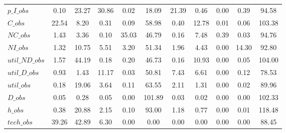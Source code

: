 \begin{center}
\begin{longtable}{lcccccccccc}
$p\_I\_obs      $	 & 	                0.10	 & 	               23.27	 & 	               30.86	 & 	                0.02	 & 	               18.09	 & 	               21.39	 & 	                0.46	 & 	                0.00	 & 	                0.39	 & 	               94.58 \\ 
$C\_obs         $	 & 	               22.54	 & 	                8.20	 & 	                0.31	 & 	                0.09	 & 	               58.98	 & 	                0.40	 & 	               12.78	 & 	                0.01	 & 	                0.06	 & 	              103.38 \\ 
$NC\_obs        $	 & 	                1.43	 & 	                3.36	 & 	                0.10	 & 	               35.03	 & 	               46.79	 & 	                0.16	 & 	                7.48	 & 	                0.39	 & 	                0.03	 & 	               94.76 \\ 
$NI\_obs        $	 & 	                1.32	 & 	               10.75	 & 	                5.51	 & 	                3.20	 & 	               51.34	 & 	                1.96	 & 	                4.43	 & 	                0.00	 & 	               14.30	 & 	               92.80 \\ 
$util\_ND\_obs  $	 & 	                1.57	 & 	               44.19	 & 	                0.18	 & 	                0.20	 & 	               46.73	 & 	                0.16	 & 	               10.93	 & 	                0.00	 & 	                0.05	 & 	              104.00 \\ 
$util\_D\_obs   $	 & 	                0.93	 & 	                1.43	 & 	               11.17	 & 	                0.03	 & 	               50.81	 & 	                7.43	 & 	                6.61	 & 	                0.00	 & 	                0.12	 & 	               78.53 \\ 
$util\_obs      $	 & 	                0.18	 & 	               19.06	 & 	                3.64	 & 	                0.11	 & 	               63.55	 & 	                2.11	 & 	                1.31	 & 	                0.00	 & 	                0.02	 & 	               89.96 \\ 
$D\_obs         $	 & 	                0.05	 & 	                0.28	 & 	                0.05	 & 	                0.00	 & 	              101.89	 & 	                0.03	 & 	                0.02	 & 	                0.00	 & 	                0.00	 & 	              102.33 \\ 
$h\_obs         $	 & 	                0.38	 & 	               20.88	 & 	                2.15	 & 	                0.10	 & 	               93.00	 & 	                1.18	 & 	                0.77	 & 	                0.00	 & 	                0.01	 & 	              118.48 \\ 
$tech\_obs      $	 & 	               39.26	 & 	               42.89	 & 	                6.30	 & 	                0.00	 & 	                0.00	 & 	                0.00	 & 	                0.00	 & 	                0.00	 & 	                0.00	 & 	               88.45 \\ 
\end{longtable}
 \end{center}
